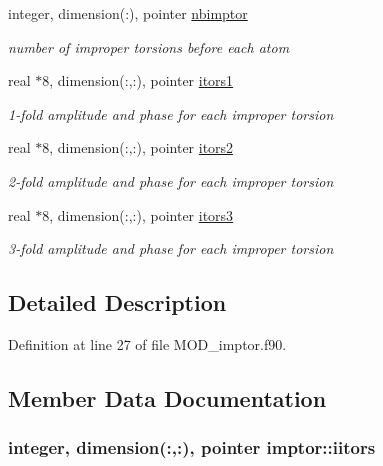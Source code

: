 \begin{DoxyCompactItemize}
integer, dimension(\-:), pointer \hyperlink{classimptor_a3c228f6a9483426d0f1a57b7fd3081f3}{nbimptor}
\begin{DoxyCompactList}\small\item\em number of improper torsions before each atom \end{DoxyCompactList}\item 
real $\ast$8, dimension(\-:,\-:), pointer \hyperlink{classimptor_a175cdae831c58f554bb5c73b4701bab7}{itors1}
\begin{DoxyCompactList}\small\item\em 1-\/fold amplitude and phase for each improper torsion \end{DoxyCompactList}\item 
real $\ast$8, dimension(\-:,\-:), pointer \hyperlink{classimptor_a4afd041ca926d3c1d458925f3a9c1bcc}{itors2}
\begin{DoxyCompactList}\small\item\em 2-\/fold amplitude and phase for each improper torsion \end{DoxyCompactList}\item 
real $\ast$8, dimension(\-:,\-:), pointer \hyperlink{classimptor_a730fdcfc67bd37927a4e78b06b41bf4d}{itors3}
\begin{DoxyCompactList}\small\item\em 3-\/fold amplitude and phase for each improper torsion \end{DoxyCompactList}\end{DoxyCompactItemize}


\subsection{Detailed Description}


Definition at line 27 of file M\-O\-D\-\_\-imptor.\-f90.



\subsection{Member Data Documentation}
\hypertarget{classimptor_a3be3642c78d002723aa963ccb9f9bc80}{
\subsubsection[{iitors}]{\setlength{\rightskip}{0pt plus 5cm}integer, dimension(\-:,\-:), pointer imptor\-::iitors}}\label{classimptor_a3be3642c78d002723aa963ccb9f9bc80}


